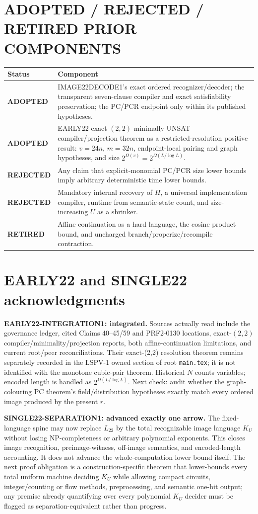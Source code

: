 \documentclass[11pt]{article}
\newcommand{\Ltwo}{L_{22}}
\newcommand{\KU}{K_U}
\newcommand{\status}[1]{\textbf{#1}}
\begin{document}
\section*{ADOPTED / REJECTED / RETIRED PRIOR COMPONENTS}
\begin{longtable}{p{}p{}}
\toprule
Status & Component \\
\midrule
\status{ADOPTED} & IMAGE22DECODE1's exact ordered recognizer/decoder; the transparent seven-clause compiler and exact satisfiability preservation; the PC/PCR endpoint only within its published hypotheses.\\
\status{ADOPTED} & EARLY22 exact-$(2,2)$ minimally-UNSAT compiler/projection theorem as a restricted-resolution positive result: $v=24n$, $m=32n$, endpoint-local pairing and graph hypotheses, and size $2^{\Omega(v)}=2^{\Omega(L/\log L)}$.\\
\status{REJECTED} & Any claim that explicit-monomial PC/PCR size lower bounds imply arbitrary deterministic time lower bounds.\\
\status{REJECTED} & Mandatory internal recovery of $H$, a universal implementation compiler, runtime from semantic-state count, and size-increasing $U$ as a shrinker.\\
\status{RETIRED} & Affine continuation as a hard language, the cosine product bound, and uncharged branch/properize/recompile contraction.\\
\bottomrule
\end{longtable}

\section*{EARLY22 and SINGLE22 acknowledgments}
\textbf{EARLY22-INTEGRATION1: integrated.}  Sources actually read include the governance ledger, cited Claims 40--45/59 and PRF2-0130 locations, exact-$(2,2)$ compiler/minimality/projection reports, both affine-continuation limitations, and current root/peer reconciliations.  Their exact-(2,2) resolution theorem remains separately recorded in the LSPV-1 owned section of root \texttt{main.tex}; it is not identified with the monotone cubic-pair theorem.  Historical $N$ counts variables; encoded length is handled as $2^{\Omega(L/\log L)}$.  Next check: audit whether the graph-colouring PC theorem's field/distribution hypotheses exactly match every ordered image produced by the present $r$.

\textbf{SINGLE22-SEPARATION1: advanced exactly one arrow.}  The fixed-language spine may now replace $\Ltwo$ by the total recognizable image language $\KU$ without losing NP-completeness or arbitrary polynomial exponents.  This closes image recognition, preimage-witness, off-image semantics, and encoded-length accounting.  It does not advance the whole-computation lower bound itself.  The next proof obligation is a construction-specific theorem that lower-bounds every total uniform machine deciding $\KU$ while allowing compact circuits, integer/counting or flow methods, preprocessing, and semantic one-bit output; any premise already quantifying over every polynomial $\KU$ decider must be flagged as separation-equivalent rather than progress.
\end{document}
